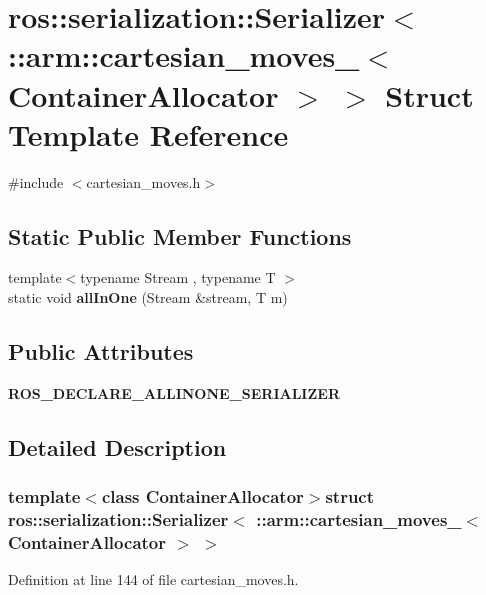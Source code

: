 \section{ros\-:\-:serialization\-:\-:\-Serializer$<$ \-:\-:arm\-:\-:cartesian\-\_\-moves\-\_\-$<$ \-Container\-Allocator $>$ $>$ \-Struct \-Template \-Reference}
\label{structros_1_1serialization_1_1Serializer_3_01_1_1arm_1_1cartesian__moves___3_01ContainerAllocator_01_4_01_4}


{\ttfamily \#include $<$cartesian\-\_\-moves.\-h$>$}

\subsection*{\-Static \-Public \-Member \-Functions}
\begin{DoxyCompactItemize}
\item 
{\footnotesize template$<$typename Stream , typename T $>$ }\\static void {\bf all\-In\-One} (\-Stream \&stream, \-T m)
\end{DoxyCompactItemize}
\subsection*{\-Public \-Attributes}
\begin{DoxyCompactItemize}
\item 
{\bf \-R\-O\-S\-\_\-\-D\-E\-C\-L\-A\-R\-E\-\_\-\-A\-L\-L\-I\-N\-O\-N\-E\-\_\-\-S\-E\-R\-I\-A\-L\-I\-Z\-E\-R}
\end{DoxyCompactItemize}


\subsection{\-Detailed \-Description}
\subsubsection*{template$<$class Container\-Allocator$>$struct ros\-::serialization\-::\-Serializer$<$ \-::arm\-::cartesian\-\_\-moves\-\_\-$<$ Container\-Allocator $>$ $>$}



\-Definition at line 144 of file cartesian\-\_\-moves.\-h.




